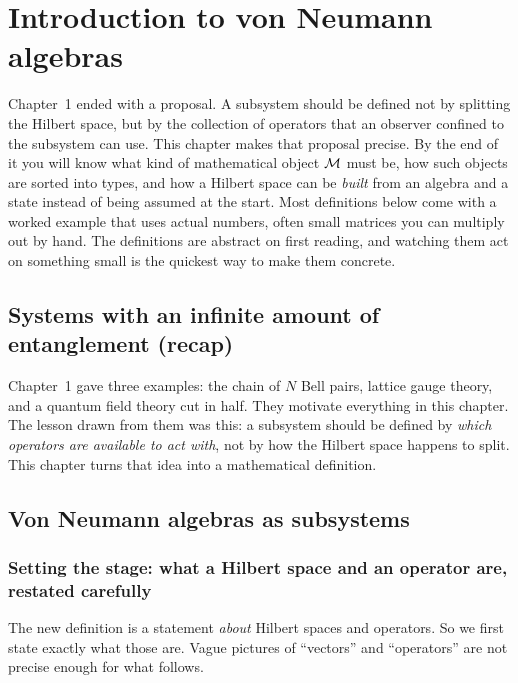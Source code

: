 \chapter{Introduction to von Neumann algebras}

Chapter~1 ended with a proposal. A subsystem should be defined not by splitting the Hilbert space, but by
the collection of operators that an observer confined to the subsystem can use. This chapter makes that
proposal precise. By the end of it you will know what kind of mathematical object $\mathcal{M}$ must be, how such
objects are sorted into types, and how a Hilbert space can be \emph{built} from an algebra and a state
instead of being assumed at the start. Most definitions below come with a worked example that uses actual
numbers, often small matrices you can multiply out by hand. The definitions are abstract on first reading,
and watching them act on something small is the quickest way to make them concrete.

\section{Systems with an infinite amount of entanglement (recap)}

Chapter~1 gave three examples: the chain of $N$ Bell pairs, lattice gauge theory, and a quantum field theory
cut in half. They motivate everything in this chapter. The lesson drawn from them was this: a subsystem
should be defined by \emph{which operators are available to act with}, not by how the Hilbert space happens
to split. This chapter turns that idea into a mathematical definition.

\section{Von Neumann algebras as subsystems}

\subsection*{Setting the stage: what a Hilbert space and an operator are, restated carefully}

The new definition is a statement \emph{about} Hilbert spaces and operators. So we first state exactly what
those are. Vague pictures of ``vectors'' and ``operators'' are not precise enough for what follows.

